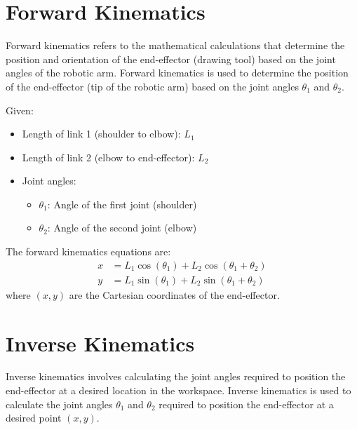 \documentclass{article}
\begin{document}
\section{Forward Kinematics}
Forward kinematics refers to the mathematical calculations that determine the position and orientation of the end-effector (drawing tool) based on the joint angles of the robotic arm.
Forward kinematics is used to determine the position of the end-effector (tip of the robotic arm) based on the joint angles \( \theta_1 \) and \( \theta_2 \).

Given:
\begin{itemize}
    \item Length of link 1 (shoulder to elbow): \( L_1 \)
    \item Length of link 2 (elbow to end-effector): \( L_2 \)
    \item Joint angles:
    \begin{itemize}
        \item \( \theta_1 \): Angle of the first joint (shoulder)
        \item \( \theta_2 \): Angle of the second joint (elbow)
    \end{itemize}
\end{itemize}

The forward kinematics equations are:
\begin{align*}
x &= L_1 \cos(\theta_1) + L_2 \cos(\theta_1 + \theta_2) \\
y &= L_1 \sin(\theta_1) + L_2 \sin(\theta_1 + \theta_2)
\end{align*}
where \( (x, y) \) are the Cartesian coordinates of the end-effector.

\section{Inverse Kinematics}
Inverse kinematics involves calculating the joint angles required to position the end-effector at a desired location in the workspace.
Inverse kinematics is used to calculate the joint angles \( \theta_1 \) and \( \theta_2 \) required to position the end-effector at a desired point \( (x, y) \).
\end{document}
